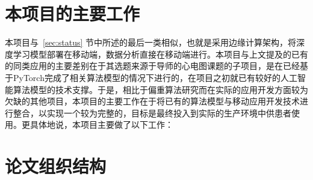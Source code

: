 \begin{figure}[h]
\begin{subcaptionblock}{.39\textwidth}
    \end{subcaptionblock}
    \label{fig:demos}
\end{figure}


\section{本项目的主要工作}\label{sec:work}

本项目与~\ref{sec:status} 节中所述的最后一类相似，也就是采用边缘计算架构，将深度学习模型部署在移动端，数据分析直接在移动端进行。本项目与上文提及的已有的同类应用的主要差别在于其选题来源于导师的心电图课题的子项目，是在已经基于PyTorch完成了相关算法模型\cite{songDongtaixindiantudezhinengjiancesuanfayanjiuyuyingyong2022}的情况下进行的，在项目之初就已有较好的人工智能算法模型的技术支撑。于是，相比于偏重算法研究而在实际的应用开发方面较为欠缺的其他项目，本项目的主要工作在于将已有的算法模型与移动应用开发技术进行整合，以实现一个较为完整的\app ，目标是最终投入到实际的生产环境中供患者使用。更具体地说，本项目主要做了以下工作：



\section{论文组织结构}\label{sec:structure}

